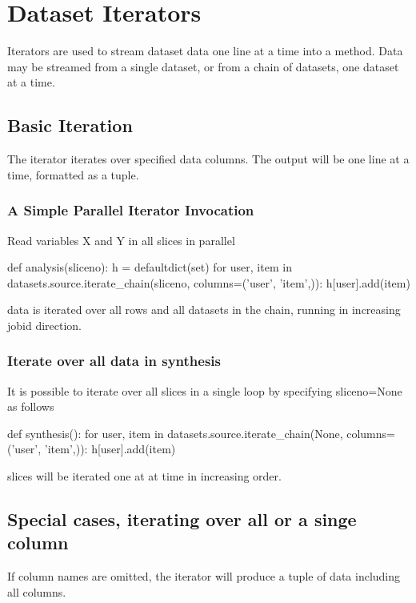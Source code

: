 \section{Dataset Iterators}

Iterators are used to stream dataset data one line at a time into a
method.  Data may be streamed from a single dataset, or from a chain
of datasets, one dataset at a time.


\subsection{Basic Iteration}

The iterator iterates over specified data columns.  The output will be
one line at a time, formatted as a tuple.

\subsubsection*{A Simple Parallel Iterator Invocation}
Read variables X and Y in all slices in parallel

\begin{python}
def analysis(sliceno):
    h = defaultdict(set)
    for user, item in datasets.source.iterate_chain(sliceno, columns=('user', 'item',)):
        h[user].add(item)
\end{python}
data is iterated over all rows and all datasets in the chain, running
in increasing jobid direction.


\subsubsection*{Iterate over all data in synthesis}
It is possible to iterate over all slices in a single loop by
specifying sliceno=None as follows

\begin{python}
def synthesis():
    for user, item in datasets.source.iterate_chain(None, columns=('user', 'item',)):
        h[user].add(item)
\end{python}
slices will be iterated one at at time in increasing order.


\subsection{Special cases, iterating over all or a singe column}
If column names are omitted, the iterator will produce a tuple of data
including all columns.  %

